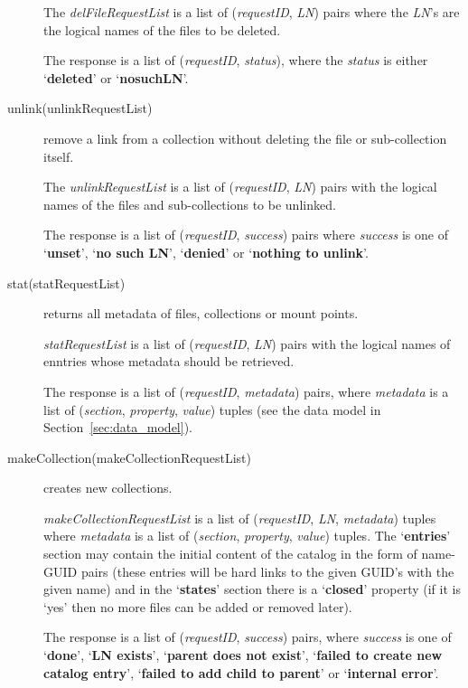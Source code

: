 \documentclass{book}
\begin{document}
\begin{description}
    The \emph{delFileRequestList} is a list of (\emph{requestID}, \emph{LN}) pairs where the \emph{LN}'s are the logical names of the files to be deleted. 
    
    The response is a list of (\emph{requestID}, \emph{status}), where the \emph{status} is either `\textbf{deleted}' or `\textbf{nosuchLN}'.
        
    \item[unlink(unlinkRequestList)] remove a link from a collection without deleting the file or sub-collection itself.
    
    The \emph{unlinkRequestList} is a list of (\emph{requestID}, \emph{LN}) pairs with the logical names of the files and sub-collections to be unlinked.
    
    The response is a list of (\emph{requestID}, \emph{success}) pairs where \emph{success} is one of `\textbf{unset}', `\textbf{no such LN}', `\textbf{denied}' or `\textbf{nothing to unlink}'.
    
    \item[stat(statRequestList)] returns all metadata of files, collections or mount points.

    \emph{statRequestList} is a list of (\emph{requestID}, \emph{LN}) pairs with the logical names of enntries whose metadata should be retrieved.
    
    The response is a list of (\emph{requestID}, \emph{metadata}) pairs, where \emph{metadata} is a list of (\emph{section}, \emph{property}, \emph{value}) tuples (see the data model in Section~\ref{sec:data_model}).
    
    \item[makeCollection(makeCollectionRequestList)] creates new collections.
    
    \emph{makeCollectionRequestList} is a list of (\emph{requestID}, \emph{LN}, \emph{metadata}) tuples where \emph{metadata} is a list of (\emph{section}, \emph{property}, \emph{value}) tuples. The `\textbf{entries}' section may contain the initial content of the catalog in the form of name-GUID pairs (these entries will be hard links to the given GUID's with the given name) and in the `\textbf{states}' section there is a `\textbf{closed}' property (if it is `yes' then no more files can be added or removed later).
    
    The response is a list of (\emph{requestID}, \emph{success}) pairs, where \emph{success} is one of `\textbf{done}', `\textbf{LN exists}', `\textbf{parent does not exist}', `\textbf{failed to create new catalog entry}', `\textbf{failed to add child to parent}' or `\textbf{internal error}'.
    

\end{description}
\end{document}
